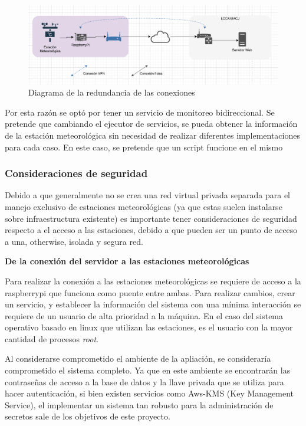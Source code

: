 \begin{figure}[!ht]
	\centering
	\includegraphics[width=.45\linewidth]{images/diagrams/conexion.png}
	\caption{Diagrama de la redundancia de las conexiones}
	\label{fig:conexion_redundancia}
\end{figure}

Por esta razón se optó por tener un servicio de monitoreo bidireccional. Se pretende que cambiando el ejecutor de servicios, se pueda obtener la información de la estación meteorológica sin necesidad de realizar diferentes implementaciones para cada caso. En este caso, se pretende que un script funcione en el mismo

\subsubsection{Consideraciones de seguridad}

Debido a que generalmente no se crea una red virtual privada separada para el manejo exclusivo de estaciones meteorológicas (ya que estas suelen instalarse sobre infraestructura existente) es importante tener consideraciones de seguridad respecto a el acceso a las estaciones, debido a que pueden ser un punto de acceso a una, otherwise, isolada y segura red.


\textbf{De la conexión del servidor a las estaciones meteorológicas}

Para realizar la conexión a las estaciones meteorológicas se requiere de acceso a la raspberrypi que funciona como puente entre ambas. Para realizar cambios, crear un servicio, y establecer la información del sistema con una mínima interacción se requiere de un usuario de alta prioridad a la máquina. En el caso del sistema operativo basado en linux que utilizan las estaciones, es el usuario con la mayor cantidad de procesos \emph{root}.

Al considerarse comprometido el ambiente de la apliación, se consideraría comprometido el sistema completo. Ya que en este ambiente se encontrarán las contraseñas de acceso a la base de datos y la llave privada que se utiliza para hacer autenticación, si bien existen servicios como Aws-KMS (Key Management Service), el implementar un sistema tan robusto para la administración de secretos sale de los objetivos de este proyecto.

